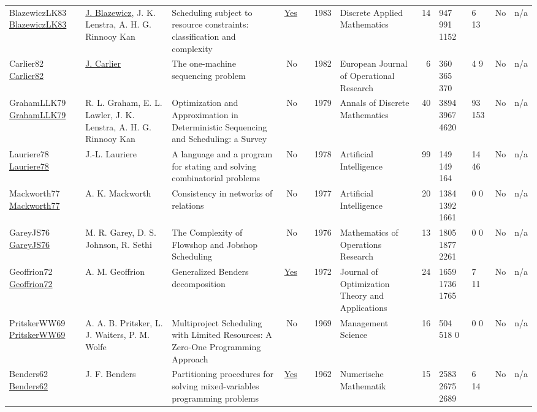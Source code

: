 {\begin{longtable}{>{\raggedright\arraybackslash}p{3cm}>{\raggedright\arraybackslash}p{4.5cm}>{\raggedright\arraybackslash}p{6.0cm}rrrp{2.5cm}rp{1cm}p{1cm}rr}
BlazewiczLK83 \href{https://doi.org/10.1016/0166-218X(83)90012-4}{BlazewiczLK83} & \hyperref[auth:a765]{J. Blazewicz}, J. K. Lenstra, A. H. G. Rinnooy Kan & \cellcolor{gold!20}Scheduling subject to resource constraints: classification and complexity & \href{../works/BlazewiczLK83.pdf}{Yes} & \cite{BlazewiczLK83} & 1983 & Discrete Applied Mathematics & 14 & 947 991 1152 & 6 13 & No & n/a\\
Carlier82 \href{http://dx.doi.org/10.1016/s0377-2217(82)80007-6}{Carlier82} & \hyperref[auth:a845]{J. Carlier} & The one-machine sequencing problem & No & \cite{Carlier82} & 1982 & European Journal of Operational Research & 6 & 360 365 370 & 4 9 & No & n/a\\
GrahamLLK79 \href{http://dx.doi.org/10.1016/s0167-5060(08)70356-x}{GrahamLLK79} & R. L. Graham, E. L. Lawler, J. K. Lenstra, A. H. G. Rinnooy Kan & \cellcolor{green!10}Optimization and Approximation in Deterministic Sequencing and Scheduling: a Survey & No & \cite{GrahamLLK79} & 1979 & Annals of Discrete Mathematics & 40 & 3894 3967 4620 & 93 153 & No & n/a\\
Lauriere78 \href{http://dx.doi.org/10.1016/0004-3702(78)90029-2}{Lauriere78} & J.-L. Lauriere & A language and a program for stating and solving combinatorial problems & No & \cite{Lauriere78} & 1978 & Artificial Intelligence & 99 & 149 149 164 & 14 46 & No & n/a\\
Mackworth77 \href{http://dx.doi.org/10.1016/0004-3702(77)90007-8}{Mackworth77} & A. K. Mackworth & Consistency in networks of relations & No & \cite{Mackworth77} & 1977 & Artificial Intelligence & 20 & 1384 1392 1661 & 0 0 & No & n/a\\
GareyJS76 \href{http://dx.doi.org/10.1287/moor.1.2.117}{GareyJS76} & M. R. Garey, D. S. Johnson, R. Sethi & The Complexity of Flowshop and Jobshop Scheduling & No & \cite{GareyJS76} & 1976 & Mathematics of Operations Research & 13 & 1805 1877 2261 & 0 0 & No & n/a\\
Geoffrion72 \href{http://dx.doi.org/10.1007/bf00934810}{Geoffrion72} & A. M. Geoffrion & Generalized Benders decomposition & \href{../works/Geoffrion72.pdf}{Yes} & \cite{Geoffrion72} & 1972 & Journal of Optimization Theory and Applications & 24 & 1659 1736 1765 & 7 11 & No & n/a\\
PritskerWW69 \href{http://dx.doi.org/10.1287/mnsc.16.1.93}{PritskerWW69} & A. A. B. Pritsker, L. J. Waiters, P. M. Wolfe & Multiproject Scheduling with Limited Resources: A Zero-One Programming Approach & No & \cite{PritskerWW69} & 1969 & Management Science & 16 & 504 518 0 & 0 0 & No & n/a\\
Benders62 \href{http://dx.doi.org/10.1007/bf01386316}{Benders62} & J. F. Benders & Partitioning procedures for solving mixed-variables programming problems & \href{../works/Benders62.pdf}{Yes} & \cite{Benders62} & 1962 & Numerische Mathematik & 15 & 2583 2675 2689 & 6 14 & No & n/a\\
\end{longtable}
}

